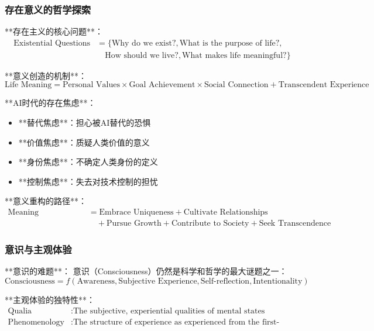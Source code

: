 \subsubsection{存在意义的哲学探索} %

**存在主义的核心问题**：
\begin{align}
\text{Existential Questions} &= \{\text{Why do we exist?}, \text{What is the purpose of life?}, \\
&\quad \text{How should we live?}, \text{What makes life meaningful?}\}
\end{align}

**意义创造的机制**：
\begin{equation}
\text{Life Meaning} = \text{Personal Values} \times \text{Goal Achievement} \times \text{Social Connection} + \text{Transcendent Experience}
\end{equation}

**AI时代的存在焦虑**：
\begin{itemize}
\item **替代焦虑**：担心被AI替代的恐惧
\item **价值焦虑**：质疑人类价值的意义
\item **身份焦虑**：不确定人类身份的定义
\item **控制焦虑**：失去对技术控制的担忧
\end{itemize}

**意义重构的路径**：
\begin{align}
\text{Meaning Reconstruction} &= \text{Embrace Uniqueness} + \text{Cultivate Relationships} \\
&\quad + \text{Pursue Growth} + \text{Contribute to Society} + \text{Seek Transcendence}
\end{align}

\subsubsection{意识与主观体验} %

**意识的难题**：
意识（Consciousness）仍然是科学和哲学的最大谜题之一：
\begin{equation}
\text{Consciousness} = f(\text{Awareness}, \text{Subjective Experience}, \text{Self-reflection}, \text{Intentionality})
\end{equation}

**主观体验的独特性**：
\begin{align}
\text{Qualia} &: \text{The subjective, experiential qualities of mental states} \\
\text{Phenomenology} &: \text{The structure of experience as experienced from the first-person point of view}
\end{align}

